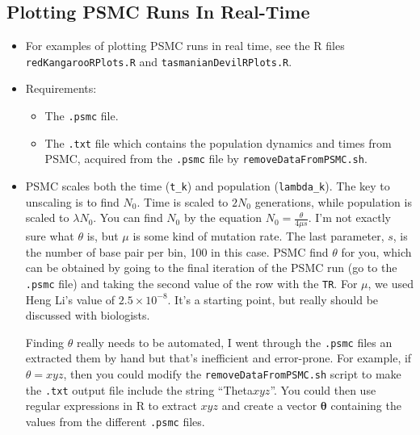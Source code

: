\documentclass[11pt,a4paper]{article}
\begin{document}
\subsection{Plotting PSMC Runs In Real-Time}\label{PlotPSMC}
\begin{itemize}
\item For examples of plotting PSMC runs in real time, see the R files \verb|redKangarooRPlots.R| and \verb|tasmanianDevilRPlots.R|.
\item Requirements:
  \begin{itemize}
    \item The \verb|.psmc| file.
    \item The \verb|.txt| file which contains the population dynamics and times from PSMC, acquired from the \verb|.psmc| file by \verb|removeDataFromPSMC.sh|.
  \end{itemize}
\item PSMC scales both the time (\verb|t_k|) and population (\verb|lambda_k|). The key to unscaling is to find $N_0$. Time is scaled to $2N_0$ generations, while population is scaled to $\lambda N_0$. You can find $N_0$ by the equation $N_0=\frac{\theta}{4\mu s}$. I'm not exactly sure what $\theta$ is, but $\mu$ is some kind of mutation rate. The last parameter, $s$, is the number of base pair per bin, 100 in this case. PSMC find $\theta$ for you, which can be obtained by going to the final iteration of the PSMC run (go to the \verb|.psmc| file) and taking the second value of the row with the \verb|TR|. For $\mu$, we used Heng Li's value of $2.5\times10^{-8}$. It's a starting point, but really should be discussed with biologists.

Finding $\theta$ really needs to be automated, I went through the \verb|.psmc| files an extracted them by hand but that's inefficient and error-prone. For example, if $\theta=xyz$, then you could modify the \verb|removeDataFromPSMC.sh| script to make the \verb|.txt| output file include the string ``Theta$xyz$''. You could then use regular expressions in R to extract $xyz$ and create a vector $\bm{\theta}$ containing the values from the different \verb|.psmc| files.


\end{itemize}
\end{document}
